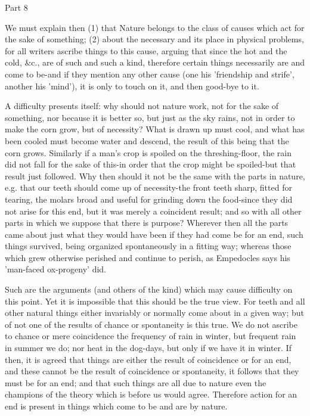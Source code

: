 Part 8

We must explain then (1) that Nature belongs to the class of causes
which act for the sake of something; (2) about the necessary and its
place in physical problems, for all writers ascribe things to this
cause, arguing that since the hot and the cold, &c., are of such and
such a kind, therefore certain things necessarily are and come to
be-and if they mention any other cause (one his 'friendship and strife',
another his 'mind'), it is only to touch on it, and then good-bye
to it. 

A difficulty presents itself: why should not nature work, not for
the sake of something, nor because it is better so, but just as the
sky rains, not in order to make the corn grow, but of necessity? What
is drawn up must cool, and what has been cooled must become water
and descend, the result of this being that the corn grows. Similarly
if a man's crop is spoiled on the threshing-floor, the rain did not
fall for the sake of this-in order that the crop might be spoiled-but
that result just followed. Why then should it not be the same with
the parts in nature, e.g. that our teeth should come up of necessity-the
front teeth sharp, fitted for tearing, the molars broad and useful
for grinding down the food-since they did not arise for this end,
but it was merely a coincident result; and so with all other parts
in which we suppose that there is purpose? Wherever then all the parts
came about just what they would have been if they had come be for
an end, such things survived, being organized spontaneously in a fitting
way; whereas those which grew otherwise perished and continue to perish,
as Empedocles says his 'man-faced ox-progeny' did. 

Such are the arguments (and others of the kind) which may cause difficulty
on this point. Yet it is impossible that this should be the true view.
For teeth and all other natural things either invariably or normally
come about in a given way; but of not one of the results of chance
or spontaneity is this true. We do not ascribe to chance or mere coincidence
the frequency of rain in winter, but frequent rain in summer we do;
nor heat in the dog-days, but only if we have it in winter. If then,
it is agreed that things are either the result of coincidence or for
an end, and these cannot be the result of coincidence or spontaneity,
it follows that they must be for an end; and that such things are
all due to nature even the champions of the theory which is before
us would agree. Therefore action for an end is present in things which
come to be and are by nature. 

